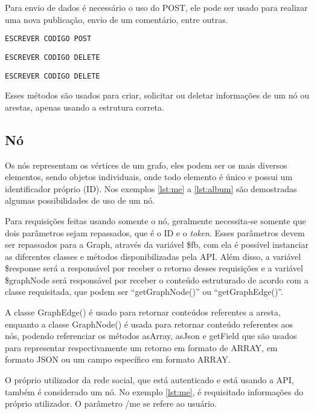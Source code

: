 Para envio de dados é necessário o uso do POST, ele pode ser usado para realizar uma nova publicação, envio de um comentário, entre outras.
\begin{lstlisting}[caption={Requsição POST},label={lst:requisicao9}]
ESCREVER CODIGO POST
\end{lstlisting}

\begin{lstlisting}[caption={Requsição DELETE},label={lst:requisicao10}]
ESCREVER CODIGO DELETE
\end{lstlisting}

\begin{lstlisting}[caption={Retorno das requisições \ref{lst:requisicao9} e \ref{lst:requisicao10}},label={lst:requisicao11}]
ESCREVER CODIGO DELETE
\end{lstlisting}

Esses métodos são usados para criar, solicitar ou deletar informações de um nó ou arestas, apenas usando a estrutura correta.

\subsection{Nó}
Os nós representam os vértices de um grafo, eles podem ser os mais diversos elementos, sendo objetos individuais, onde todo elemento é único e possui um identificador próprio (ID). Nos exemplos \ref{lst:me} a \ref{lst:album} são demostradas algumas possibilidades de uso de um nó.

Para requisições feitas usando somente o nó, geralmente necessita-se somente que dois parâmetros sejam repassados, que é o ID e o \textit{token}. Esses parâmetros devem ser repassados para a Graph, através da variável \$fb, com ela é possível instanciar as diferentes classes e métodos disponibilizadas pela API. Além disso, a variável \$response será a responsável por receber o retorno desses requisições e a variável \$graphNode será responsável por receber o conteúdo estruturado de acordo com a classe requisitada, que podem ser ``getGraphNode()'' ou ``getGraphEdge()''.

A classe GraphEdge() é usado para retornar conteúdos referentes a aresta, enquanto a classe GraphNode() é usada para retornar conteúdo referentes aos nós, podendo referenciar os métodos asArray, asJson e getField que são usados para representar respectivamente um retorno em formato de ARRAY, em formato JSON ou um campo específico em formato ARRAY.

O próprio utilizador da rede social, que está autenticado e está usando a API, também é considerado um nó. No exemplo \ref{lst:me}, é requisitado informações do próprio utilizador. O parâmetro /me se refere ao usuário.

